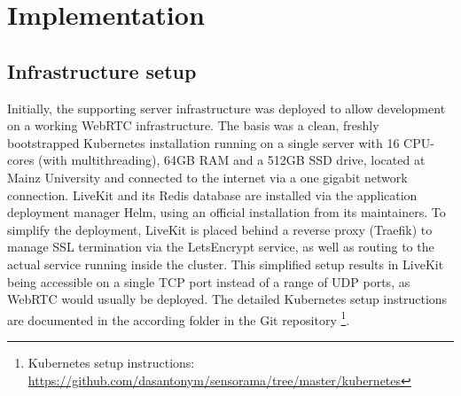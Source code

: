 \chapter{Implementation}

\section{Infrastructure setup}

Initially, the supporting server infrastructure was deployed to allow development on a working WebRTC infrastructure. The basis was a clean, freshly bootstrapped Kubernetes installation running on a single server with 16 CPU-cores (with multithreading), 64GB RAM and a 512GB SSD drive, located at Mainz University and connected to the internet via a one gigabit network connection. LiveKit and its Redis database are installed via the application deployment manager Helm, using an official installation from its maintainers. To simplify the deployment, LiveKit is placed behind a reverse proxy (Traefik) to manage SSL termination via the LetsEncrypt service, as well as routing to the actual service running inside the cluster. This simplified setup results in LiveKit being accessible on a single TCP port instead of a range of UDP ports, as WebRTC would usually be deployed. The detailed Kubernetes setup instructions are documented in the according folder in the Git repository \footnote{Kubernetes setup instructions: \href{https://github.com/dasantonym/sensorama/tree/master/kubernetes}{https://github.com/dasantonym/sensorama/tree/master/kubernetes}}.

